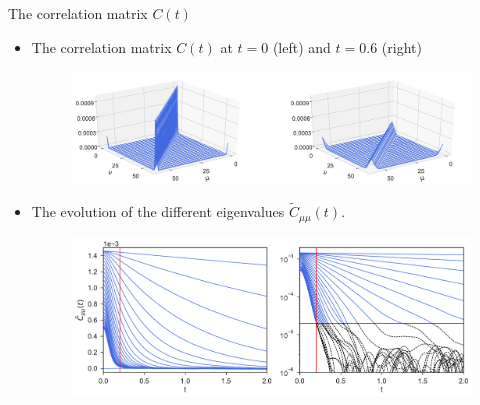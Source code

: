 \documentclass{beamer}
\begin{document}
 \begin{frame}{The correlation matrix $C(t)$}
   \begin{itemize}
 \item
   The correlation matrix $C(t)$ at $t=0$ (left) and $t=0.6$ (right)
\begin{figure}[h!]
\includegraphics[width=\linewidth]{Ct-matrix-PBC}
\end{figure}
\item  The evolution of the different eigenvalues $\tilde{C}_{\mu\mu}(t)$. %
\begin{figure}[h!]
  \includegraphics[width=\linewidth]{CtFourier-PBC-exp}
\end{figure}
\end{itemize}
\end{frame}
\end{document}
